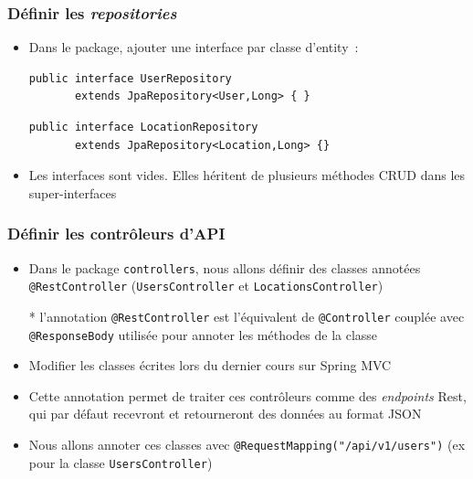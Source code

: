 \documentclass{beamer}
\begin{document}
\begin{frame}[fragile]
	\frametitle{Définir les \textit{repositories}}
	\begin{itemize}
		\item Dans le package, ajouter une interface par classe d'entity~:
\begin{lstlisting}
public interface UserRepository 
       extends JpaRepository<User,Long> { }
\end{lstlisting}
\begin{lstlisting}
public interface LocationRepository 
       extends JpaRepository<Location,Long> {}
\end{lstlisting}
\item Les interfaces sont vides. Elles héritent de plusieurs méthodes CRUD dans les super-interfaces
	\end{itemize}
\end{frame} 

\begin{frame}[fragile]
	\frametitle{Définir les contrôleurs d'API}
	\begin{itemize}
		\item Dans le package \texttt{controllers}, nous allons définir des classes annotées \texttt{@RestController} (\texttt{UsersController} et \texttt{LocationsController})
		\item[*] l'annotation \texttt{@RestController} est l'équivalent de \texttt{@Controller} couplée avec \texttt{@ResponseBody} utilisée pour annoter les méthodes de la classe
		\item Modifier les classes écrites lors du dernier cours sur Spring MVC
		\item Cette annotation permet de traiter ces contrôleurs comme des \textit{endpoints} Rest, qui par défaut recevront et retourneront des données au format JSON
		\item Nous allons annoter ces classes avec \texttt{@RequestMapping("/api/v1/users")} (ex pour la classe \texttt{UsersController})
		
	\end{itemize}
\end{frame}
\end{document}
